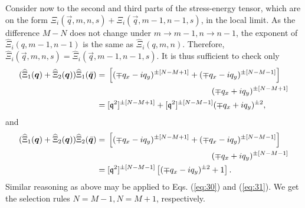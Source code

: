 Consider now to the second and third parts of the stress-energy tensor, which are on the form $\Xi _i(\vec{q}, m, n , s) + \Xi _i (\vec{q}, m-1, n-1, s)$, in the local limit.
As the difference $M-N$ does not change under $m\to m-1, n\to n-1$, the exponent of $\widehat{\Xi} _i(q, m-1, n-1)$ is the same as $\widehat{\Xi} _i(q, m, n)$.
Therefore, $\widehat{\Xi} _i(\vec{q}, m, n, s) = \widehat{\Xi} _i(\vec{q}, m-1, n-1, s)$.
It is thus sufficient to check only
\begin{equation}
  \label{eq:30}
  \begin{split}
    (\widehat{\Xi} _1(\vec{q}) + \widehat{\Xi} _2(\vec{q}))
    \widehat{\Xi} _1(\bar{\vec{q}})
      &=
      \begin{multlined}[t]
        \left[ (\mp q_x - iq_y)^{\pm [N-M + 1]} + (\mp q_x - iq_y)^{\pm [N-M-1]} \right]\\
        (\mp q_x + iq_y)^{\pm [N-M + 1]}
      \end{multlined}
      \\
      &= [\qvec{q}^2]^{\pm [N-M+1]} + [\qvec{q}^2]^{\pm [N-M-1]} (\mp q_x + iq_y)^{\pm 2},
  \end{split}
\end{equation}
and
\begin{equation}
  \label{eq:31}
  \begin{split}
    (\widehat{\Xi} _1(\vec{q}) + \widehat{\Xi} _2(\vec{q}))
    \widehat{\Xi} _2(\bar{\vec{q}})
      &=
      \begin{multlined}[t]
        \left[ (\mp q_x - iq_y)^{\pm [N-M + 1]} + (\mp q_x - iq_y)^{\pm [N-M-1]} \right]\\
        (\mp q_x + iq_y)^{\pm [N-M - 1]}
      \end{multlined}
      \\
      &= [\qvec{q}^2]^{\pm [N-M-1]} \left[ (\mp q_x - iq_y )^{\pm 2} +  1 \right].
  \end{split}
\end{equation}
Similar reasoning as above may be applied to Eqs. (\ref{eq:30}) and (\ref{eq:31}).
We get the selection rules \( N = M - 1, N= M+1 \), respectively.

